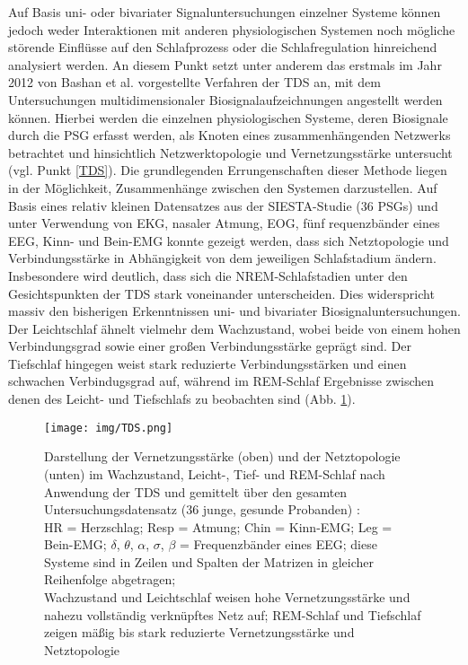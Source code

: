 Auf Basis uni- oder bivariater Signaluntersuchungen einzelner Systeme können jedoch weder Interaktionen mit anderen physiologischen Systemen noch mögliche störende Einflüsse auf den Schlafprozess oder die Schlafregulation hinreichend analysiert werden. An diesem Punkt setzt unter anderem das erstmals im Jahr 2012 von Bashan et al. vorgestellte Verfahren der \acs{TDS} an, mit dem Untersuchungen multidimensionaler Biosignalaufzeichnungen angestellt werden können. Hierbei werden die einzelnen physiologischen Systeme, deren Biosignale durch die \acs{PSG} erfasst werden, als Knoten eines zusammenhängenden Netzwerks betrachtet und hinsichtlich Netzwerktopologie und Vernetzungsstärke untersucht (vgl. Punkt \ref{TDS}). Die grundlegenden Errungenschaften dieser Methode liegen in der Möglichkeit, Zusammenhänge zwischen den Systemen darzustellen. Auf Basis eines relativ kleinen Datensatzes aus der SIESTA-Studie (36 \acs{PSG}s) \parencite{klosch_siesta_2001} und unter Verwendung von \acs{EKG}, nasaler Atmung, \acs{EOG}, fünf requenzbänder eines \acs{EEG}, Kinn- und Bein-\acs{EMG} konnte gezeigt werden, dass sich Netztopologie und Verbindungsstärke in Abhängigkeit von dem jeweiligen Schlafstadium ändern. Insbesondere wird deutlich, dass sich die \acs{NREM}-Schlafstadien unter den Gesichtspunkten der \acs{TDS} stark voneinander unterscheiden. Dies widerspricht massiv den bisherigen Erkenntnissen uni- und bivariater Biosignaluntersuchungen. Der Leichtschlaf ähnelt vielmehr dem Wachzustand, wobei beide von einem hohen Verbindungsgrad sowie einer großen Verbindungsstärke geprägt sind. Der Tiefschlaf hingegen weist stark reduzierte Verbindungsstärken und einen schwachen Verbindugsgrad auf, während im \acs{REM}-Schlaf Ergebnisse zwischen denen des Leicht- und Tiefschlafs zu beobachten sind (Abb. \ref{fig:TDS}). \parencite{bashan_network_2012}

\begin{figure}[H]
	\centering
	\texttt{[image: img/TDS.png]}
	\caption[Vernetzungsstärke und Netztopologie im \acs{TDS} Verfahren]{Darstellung der Vernetzungsstärke (oben) und der Netztopologie (unten) im Wachzustand, Leicht-, Tief- und \acs{REM}-Schlaf nach Anwendung der \acs{TDS} und gemittelt über den gesamten Untersuchungsdatensatz (36 junge, gesunde Probanden) \parencite{bashan_network_2012}:\\HR = Herzschlag; Resp = Atmung; Chin = Kinn-\acs{EMG}; Leg = Bein-\acs{EMG}; $\delta$, $\theta$, $\alpha$, $\sigma$, $\beta$ = Frequenzbänder eines \acs{EEG}; diese Systeme sind in Zeilen und Spalten der Matrizen in gleicher Reihenfolge abgetragen;\\Wachzustand und Leichtschlaf weisen hohe Vernetzungsstärke und nahezu vollständig verknüpftes Netz auf; \acs{REM}-Schlaf und Tiefschlaf zeigen mäßig bis stark reduzierte Vernetzungsstärke und Netztopologie\\}
	\label{fig:TDS}
\end{figure}


